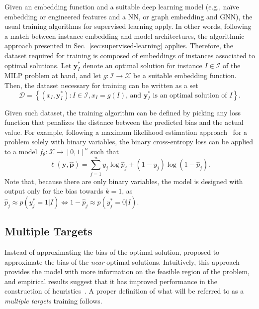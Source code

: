 Given an embedding function and a suitable deep learning model (e.g., naïve embedding or engineered features and a NN, or graph embedding and GNN), the usual training algorithms for supervised learning apply.
In other words, following a match between instance embedding and model architectures, the algorithmic approach presented in Sec.~\ref{sec:supervised-learning} applies.
Therefore, the dataset required for training is composed of embeddings of instances associated to optimal solutions.
Let $\bm{y}^{*}_I$ denote an optimal solution for instance $I\in \mathcal{I}$ of the MILP problem at hand, and let $g: \mathcal{I} \longrightarrow \mathcal{X}$ be a suitable embedding function.
Then, the dataset necessary for training can be written as a set \[
    \mathcal{D} = \left\{ (x_I, \bm{y}^{*}_I) : I \in \mathcal{I}, x_I = g(I) \text{, and } \bm{y}^*_I\text{ is an optimal solution of }I \right\} 
.\] 

Given such dataset, the training algorithm can be defined by picking any loss function that penalizes the distance between the predicted bias and the actual value.
For example, following a maximum likelihood estimation approach~\cite{goodfellowQualitativelyCharacterizingNeural2015} for a problem solely with binary variables, the binary cross-entropy loss can be applied to a model $f_{\theta}: \mathcal{X} \longrightarrow \left[ 0,1 \right]^n$ such that
\begin{equation}\label{eq:bce-loss}
    \ell(\bm{y}, \hat{\bm{p}}) = \sum_{j=1}^{n} y_j \log \hat{p}_j + (1-y_j) \log (1 - \hat{p}_j)
.\end{equation}
Note that, because there are only binary variables, the model is designed with output only for the bias towards $k=1$, as $\hat{p}_j\approx p(y_j^*=1|I) \iff 1-\hat{p}_j\approx p(y_j^*=0|I)$.


\subsection{Multiple Targets}\label{sec:multiple-targets}

Instead of approximating the bias of the optimal solution,  proposed to approximate the bias of the \emph{near}-optimal solutions.
Intuitively, this approach provides the model with more information on the feasible region of the problem, and empirical results suggest that it has improved performance in the construction of heuristics~\cite{khalilMIPGNNDataDrivenFramework2022,hanGNNGuidedPredictandSearchFramework2023}.
A proper definition of what will be referred to as a \emph{multiple targets} training follows.

